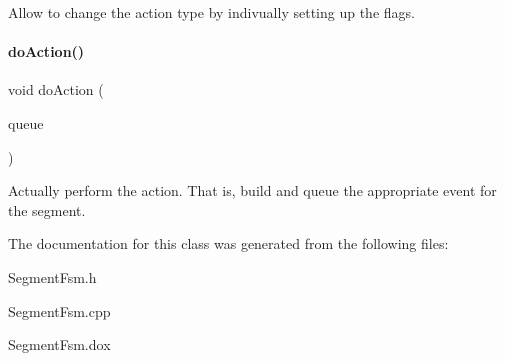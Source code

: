 Allow to change the action type by indivually setting up the flags. \mbox{\label{classKite_1_1SegmentAction_a324f17f0f5a09b76344eb2e003695d74}} 
\paragraph{\texorpdfstring{do\+Action()}{doAction()}}
{\footnotesize\ttfamily void do\+Action (\begin{DoxyParamCaption}\item[{\hyperlink{classKite_1_1RoutingEventQueue}{Routing\+Event\+Queue} \&}]{queue }\end{DoxyParamCaption})}

Actually perform the action. That is, build and queue the appropriate event for the segment. 

The documentation for this class was generated from the following files\+:\begin{DoxyCompactItemize}
\item 
Segment\+Fsm.\+h\item 
Segment\+Fsm.\+cpp\item 
Segment\+Fsm.\+dox\end{DoxyCompactItemize}
